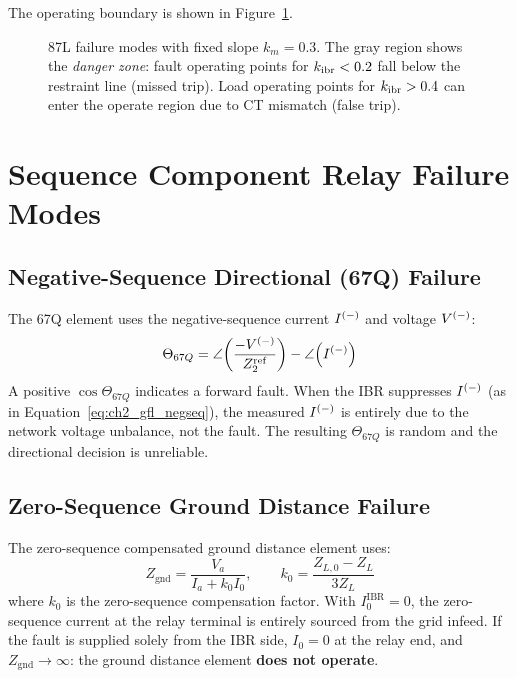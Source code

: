 The operating boundary is shown in Figure~\ref{fig:ch3_87l_failure}.

\begin{figure}[htbp]
  \centering
  
  \caption{87L failure modes with fixed slope $k_m = 0.3$. The gray
           region shows the \emph{danger zone}: fault operating points
           for $k_{\mathrm{ibr}} < 0.2$ fall below the restraint line (missed trip).
           Load operating points for $k_{\mathrm{ibr}} > 0.4$ can enter the operate
           region due to CT mismatch (false trip).}
  \label{fig:ch3_87l_failure}
\end{figure}

\section{Sequence Component Relay Failure Modes}
\label{sec:ch3_sequence}

\subsection{Negative-Sequence Directional (67Q) Failure}

The 67Q element uses the negative-sequence current $I^{(-)}$ and voltage $V^{(-)}$:
\begin{equation}
  \Theta_{67Q} = \angle\!\left(\frac{-V^{(-)}}{Z_2^\mathrm{ref}}\right) - \angle\!\left(I^{(-)}\right)
  \label{eq:ch3_67q_angle}
\end{equation}
A positive $\cos\Theta_{67Q}$ indicates a forward fault. When the IBR
suppresses $I^{(-)}$ (as in Equation~\ref{eq:ch2_gfl_negseq}),
the measured $I^{(-)}$ is entirely due to the network voltage unbalance,
not the fault. The resulting $\Theta_{67Q}$ is random and the directional
decision is unreliable.

\subsection{Zero-Sequence Ground Distance Failure}

The zero-sequence compensated ground distance element uses:
\begin{equation}
  Z_\mathrm{gnd} = \frac{V_a}{I_a + k_0 I_0}, \qquad
  k_0 = \frac{Z_{L,0} - Z_L}{3 Z_L}
  \label{eq:ch3_gnd_dist}
\end{equation}
where $k_0$ is the zero-sequence compensation factor. With
$I_0^\mathrm{IBR} = 0$, the zero-sequence current at the relay terminal
is entirely sourced from the grid infeed. If the fault is supplied solely
from the IBR side, $I_0 = 0$ at the relay end, and $Z_\mathrm{gnd} \to \infty$:
the ground distance element \textbf{does not operate}.

